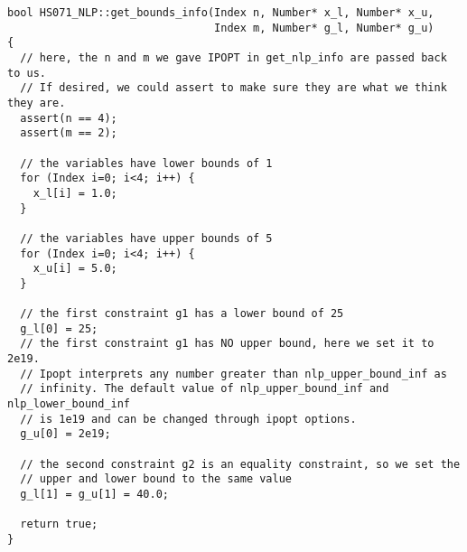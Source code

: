 \documentclass[10pt]{article}
\begin{document}
\begin{footnotesize}
\begin{verbatim}
bool HS071_NLP::get_bounds_info(Index n, Number* x_l, Number* x_u,
                                Index m, Number* g_l, Number* g_u)
{
  // here, the n and m we gave IPOPT in get_nlp_info are passed back to us.
  // If desired, we could assert to make sure they are what we think they are.
  assert(n == 4);
  assert(m == 2);

  // the variables have lower bounds of 1
  for (Index i=0; i<4; i++) {
    x_l[i] = 1.0;
  }

  // the variables have upper bounds of 5
  for (Index i=0; i<4; i++) {
    x_u[i] = 5.0;
  }

  // the first constraint g1 has a lower bound of 25
  g_l[0] = 25;
  // the first constraint g1 has NO upper bound, here we set it to 2e19.
  // Ipopt interprets any number greater than nlp_upper_bound_inf as 
  // infinity. The default value of nlp_upper_bound_inf and nlp_lower_bound_inf
  // is 1e19 and can be changed through ipopt options.
  g_u[0] = 2e19;

  // the second constraint g2 is an equality constraint, so we set the 
  // upper and lower bound to the same value
  g_l[1] = g_u[1] = 40.0;

  return true;
}
\end{verbatim}
\end{footnotesize}
\end{document}
